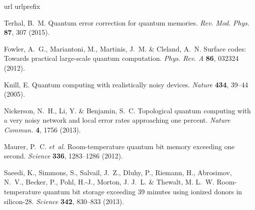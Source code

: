 \documentclass[aps,prb,superscriptaddress,nobibnotes,preprint]{revtex4-1}%
\begin{document}
\begin{thebibliography}{10}

\expandafter\ifx\csname url\endcsname\relax
  \def\url#1{\texttt{#1}}\fi
\expandafter\ifx\csname urlprefix\endcsname\relax\def\urlprefix{URL }\fi
\providecommand{\bibinfo}[2]{#2}
\providecommand{\eprint}[2][]{\url{#2}}

\bibinfo{author}{Terhal, B.~M.}
\newblock \bibinfo{title}{Quantum error correction for quantum memories}.
\newblock \emph{\bibinfo{journal}{Rev. Mod. Phys.}}
  \textbf{\bibinfo{volume}{87}}, \bibinfo{pages}{307} (\bibinfo{year}{2015}).

\bibinfo{author}{Fowler, A.~G.}, \bibinfo{author}{Mariantoni, M.},
  \bibinfo{author}{Martinis, J.~M.} \& \bibinfo{author}{Cleland, A.~N.}
\newblock \bibinfo{title}{Surface codes: Towards practical large-scale quantum
  computation}.
\newblock \emph{\bibinfo{journal}{Phys. Rev. A}} \textbf{\bibinfo{volume}{86}},
  \bibinfo{pages}{032324} (\bibinfo{year}{2012}).

\bibinfo{author}{Knill, E.}
\newblock \bibinfo{title}{Quantum computing with realistically noisy devices}.
\newblock \emph{\bibinfo{journal}{Nature}} \textbf{\bibinfo{volume}{434}},
  \bibinfo{pages}{39--44} (\bibinfo{year}{2005}).

\bibinfo{author}{Nickerson, N.~H.}, \bibinfo{author}{Li, Y.} \&
  \bibinfo{author}{Benjamin, S.~C.}
\newblock \bibinfo{title}{Topological quantum computing with a very noisy
  network and local error rates approaching one percent}.
\newblock \emph{\bibinfo{journal}{Nature Commun.}} \textbf{\bibinfo{volume}{4}},
  \bibinfo{pages}{1756} (\bibinfo{year}{2013}).

\bibinfo{author}{Maurer, P.~C.} \emph{et~al.}
\newblock \bibinfo{title}{Room-temperature quantum bit memory exceeding one
  second}.
\newblock \emph{\bibinfo{journal}{Science}} \textbf{\bibinfo{volume}{336}},
  \bibinfo{pages}{1283--1286} (\bibinfo{year}{2012}).

\bibinfo{author}{Saeedi, K.}, \bibinfo{author}{Simmons, S.},
  \bibinfo{author}{Salvail, J.~Z.}, \bibinfo{author}{Dluhy, P.},
  \bibinfo{author}{Riemann, H.}, \bibinfo{author}{Abrosimov, N.~V.},
  \bibinfo{author}{Becker, P.}, \bibinfo{author}{Pohl, H.-J.},
  \bibinfo{author}{Morton, J. J.~L.} \& \bibinfo{author}{Thewalt, M. L.~W.}
\newblock \bibinfo{title}{Room-temperature quantum bit storage exceeding 39
  minutes using ionized donors in silicon-28}.
\newblock \emph{\bibinfo{journal}{Science}} \textbf{\bibinfo{volume}{342}},
  \bibinfo{pages}{830--833} (\bibinfo{year}{2013}).


\end{thebibliography}
\end{document}
